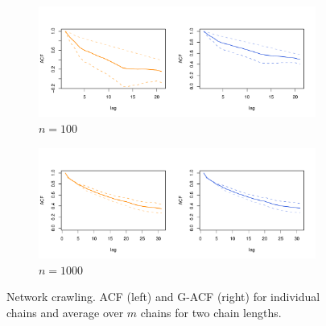 \documentclass[11pt]{article}
\theoremstyle{remark}
\begin{document}
\begin{figure}
    \centering
    \begin{subfigure}[h]{.8\textwidth}
      \centering
      \includegraphics[width = \textwidth]{plots/magnolia-acf_n100.pdf}
      \caption{$n = 100$}
      \label{subfig:magnolia-acf_n1e3}
    \end{subfigure}
    \begin{subfigure}[h]{.8\textwidth}
      \centering
      \includegraphics[width = \textwidth]{plots/magnolia-acf_n1000.pdf}
      \caption{$n = 1000$}
      \label{subfig:magnolia-acf_n1e4}
    \end{subfigure}
    \caption{Network crawling. ACF (left) and G-ACF (right) for individual chains and average over $m$ chains for two chain lengths.}
    \label{fig:magnolia-acf}
\end{figure}

\end{document}
